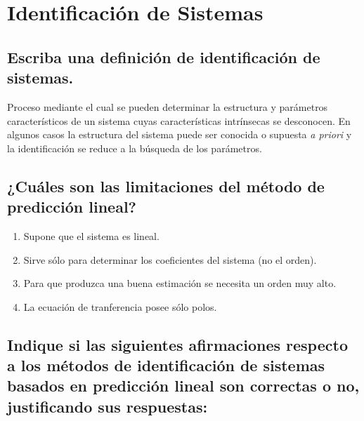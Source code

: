 \documentclass[a4paper,10pt,spanish,oneside]{article}
\begin{document}

\section{Identificación de Sistemas}

\subsection{Escriba una definición de identificación de sistemas.}	

Proceso mediante el cual se pueden determinar la estructura y parámetros característicos de un sistema cuyas características intrínsecas se desconocen. En algunos casos la estructura del sistema puede ser conocida o supuesta \textit{a priori} y la identificación se reduce a la búsqueda de los parámetros.

\subsection{¿Cuáles son las limitaciones del método de predicción lineal?}

\begin{enumerate}[1.]
\item Supone que el sistema es lineal.
\item Sirve sólo para determinar los coeficientes del sistema (no el orden).
\item Para que produzca una buena estimación se necesita un orden muy alto.
\item La ecuación de tranferencia posee sólo polos.
\end{enumerate}

\subsection{Indique si las siguientes afirmaciones respecto a los métodos de identificación de sistemas basados en predicción lineal son correctas o no, justificando sus respuestas:}
\end{document}
